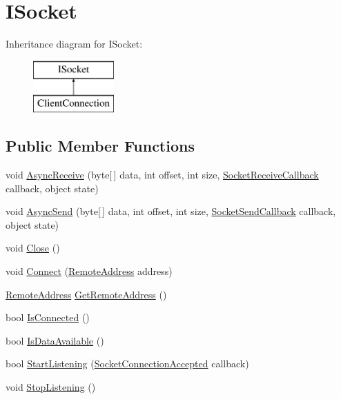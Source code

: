 \hypertarget{interfaceOTA_1_1Callbacks_1_1ISocket}{}\section{I\+Socket}
\label{interfaceOTA_1_1Callbacks_1_1ISocket}
Inheritance diagram for I\+Socket\+:\begin{figure}[H]
\begin{center}
\leavevmode
\includegraphics[height=2.000000cm]{interfaceOTA_1_1Callbacks_1_1ISocket}
\end{center}
\end{figure}
\subsection*{Public Member Functions}
\begin{DoxyCompactItemize}
\item 
void \hyperlink{interfaceOTA_1_1Callbacks_1_1ISocket_a0131ade4ba879fac2b6d466a6cb83e0c}{Async\+Receive} (byte\mbox{[}$\,$\mbox{]} data, int offset, int size, \hyperlink{namespaceOTA_1_1Callbacks_ae072013cce199869fb359bea97dbdb17}{Socket\+Receive\+Callback} callback, object state)
\item 
void \hyperlink{interfaceOTA_1_1Callbacks_1_1ISocket_a43bc672371744e6b2ebdeb7de49e6189}{Async\+Send} (byte\mbox{[}$\,$\mbox{]} data, int offset, int size, \hyperlink{namespaceOTA_1_1Callbacks_a23847c8d354ca8b53cfd6a3f466e0099}{Socket\+Send\+Callback} callback, object state)
\item 
void \hyperlink{interfaceOTA_1_1Callbacks_1_1ISocket_a7f7a3199c392465d0767c6506c1af5b4}{Close} ()
\item 
void \hyperlink{interfaceOTA_1_1Callbacks_1_1ISocket_ae9cb57357bdb0517823d7e663c4544f6}{Connect} (\hyperlink{classOTA_1_1Callbacks_1_1RemoteAddress}{Remote\+Address} address)
\item 
\hyperlink{classOTA_1_1Callbacks_1_1RemoteAddress}{Remote\+Address} \hyperlink{interfaceOTA_1_1Callbacks_1_1ISocket_af6dac4f7824ece5d8eac8078fee01087}{Get\+Remote\+Address} ()
\item 
bool \hyperlink{interfaceOTA_1_1Callbacks_1_1ISocket_ab8e2702adca8f47228f9754f4963455d}{Is\+Connected} ()
\item 
bool \hyperlink{interfaceOTA_1_1Callbacks_1_1ISocket_ab2323e7b79a1fe7b29ff0d20ac2f0a2c}{Is\+Data\+Available} ()
\item 
bool \hyperlink{interfaceOTA_1_1Callbacks_1_1ISocket_a2d9d2524de656d8fd8106f2f0df42f6c}{Start\+Listening} (\hyperlink{namespaceOTA_1_1Callbacks_afb9741507c3efff20f6f9a86dc42af20}{Socket\+Connection\+Accepted} callback)
\item 
void \hyperlink{interfaceOTA_1_1Callbacks_1_1ISocket_a16fd1b0cb96e78851dcd78fce8774c21}{Stop\+Listening} ()
\end{DoxyCompactItemize}


